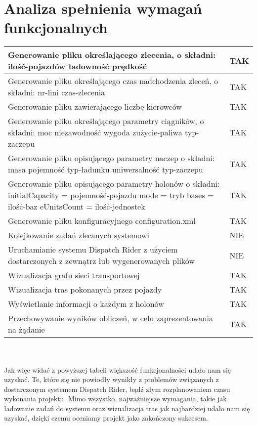 \section{Analiza spełnienia wymagań funkcjonalnych}

\begin{tabularx}{\textwidth}{ |X|p{2cm}| }
  \hline
  Generowanie pliku określającego zlecenia, o składni: ilość-pojazdów ładowność
prędkość
 & TAK  \\
  \hline
  Generowanie pliku określającego czas nadchodzenia zleceń, o składni: nr-lini czas-zlecenia  & TAK  \\
  \hline
  Generowanie pliku zawierającego liczbę kierowców & TAK \\
  \hline
  Generowanie pliku określającego parametry ciągników, o składni: moc niezawodność wygoda zużycie-paliwa typ-zaczepu & TAK \\
  \hline
  Generowanie pliku opisującego parametry naczep o składni: masa pojemność
typ-ładunku uniwersalność typ-zaczepu & TAK \\
  \hline
  Generowanie pliku opisującego parametry holonów o składni: initialCapacity =
pojemność-pojazdu mode = tryb bases = ilość-baz eUnitsCount = ilość-jednostek & TAK \\
  \hline
  Generowanie pliku konfiguracyjnego configuration.xml & TAK \\
  \hline
  Kolejkowanie zadań zlecanych systemowi & NIE \\
  \hline
  Uruchamianie systemu Dispatch Rider z użyciem dostarczonych z zewnątrz lub wygenerowanych plików & NIE \\
  \hline
  Wizualizacja grafu sieci transportowej & TAK \\
  \hline
  Wizualizacja tras pokonanych przez pojazdy & TAK \\
  \hline
  Wyświetlanie informacji o każdym z holonów & TAK \\
  \hline
  Przechowywanie wyników obliczeń, w celu zaprezentowania na żądanie & TAK \\
  \hline
\end{tabularx}
\\ \\
Jak więc widać z powyższej tabeli większość funkcjonalności udało nam się uzyskać. Te, które się nie powiodły
wynikły z problemów związanych z dostarczonym systemem Dispatch Rider, bądź złym rozplanowaniem czasu wykonania
projektu. Mimo wszystko, najważniejsze wymagania, takie jak ładowanie zadań do systemu oraz wizualizacja tras
jak najbardziej udało nam się uzyskać, dzięki czemu oceniamy projekt jako zakończony sukcesem.

